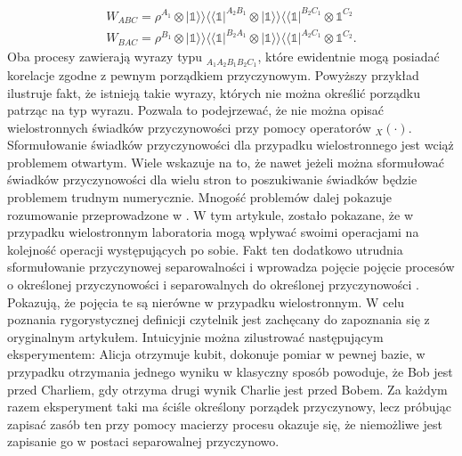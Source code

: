 \documentclass[10pt]{article} %
\newcommand{\BBra}[1]{\langle\langle#1|}
\newcommand{\KKet}[1]{|#1\rangle\rangle}
\newcommand{\I}{\mathbb{1}}
\begin{document}
\begin{gather}
W_{ABC} = \rho^{A_1} \otimes \KKet{\I}\BBra{\I}^{A_2B_1}\otimes \KKet{\I}\BBra{\I}^{B_2C_1} \otimes \I^{C_2} \\
W_{BAC} = \rho^{B_1} \otimes \KKet{\I}\BBra{\I}^{B_2A_1} \otimes \KKet{\I}\BBra{\I}^{A_2C_1} \otimes \I^{C_2}.
\end{gather} Oba procesy zawierają wyrazy typu ${}_{A_1A_2B_1B_2C_1}$, które ewidentnie mogą posiadać korelacje zgodne z pewnym porządkiem przyczynowym. Powyższy przykład ilustruje fakt, że istnieją takie wyrazy, których nie można określić porządku patrząc na typ wyrazu. Pozwala to podejrzewać, że nie można opisać wielostronnych świadków przyczynowości przy pomocy operatorów ${}_X(\cdot)$. Sformułowanie świadków przyczynowości dla przypadku wielostronnego jest wciąż problemem otwartym. Wiele wskazuje na to, że nawet jeżeli można sformułować świadków przyczynowości dla wielu stron to poszukiwanie świadków będzie problemem trudnym numerycznie. Mnogość problemów dalej pokazuje rozumowanie przeprowadzone w \cite{mp_cs}. W tym artykule, zostało pokazane, że w przypadku wielostronnym laboratoria mogą wpływać swoimi operacjami na kolejność operacji występujących po sobie. Fakt ten dodatkowo utrudnia sformułowanie przyczynowej separowalności i wprowadza pojęcie pojęcie procesów o określonej przyczynowości i separowalnych do określonej przyczynowości \cite{mp_cs}. Pokazują, że pojęcia te są nierówne w przypadku wielostronnym. W celu poznania rygorystycznej definicji czytelnik jest zachęcany do zapoznania się z oryginalnym artykułem. Intuicyjnie można zilustrować następującym eksperymentem: Alicja otrzymuje kubit, dokonuje pomiar w pewnej bazie, w przypadku otrzymania jednego wyniku w klasyczny sposób powoduje, że Bob jest przed Charliem, gdy otrzyma drugi wynik Charlie jest przed Bobem. Za każdym razem eksperyment taki ma ściśle określony porządek przyczynowy, lecz próbując zapisać zasób ten przy pomocy macierzy procesu okazuje się, że niemożliwe jest zapisanie go w postaci  separowalnej przyczynowo. 
 
\end{document}
